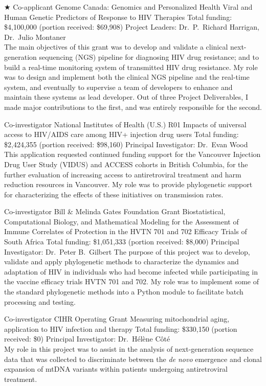 {$\bigstar$ Co-applicant}
{Genome Canada: Genomics and Personalized Health}
{Viral and Human Genetic Predictors of Response to HIV Therapies}
{Total funding: \$4,100,000 (portion received: \$69,908)}
{
Project Leaders: Dr.~P.~Richard Harrigan, Dr.~Julio Montaner\\
The main objectives of this grant was to develop and validate a clinical next-generation sequencing (NGS) pipeline for diagnosing HIV drug resistance;
and to build a real-time monitoring system of transmitted HIV drug resistance.
My role was to design and implement both the clinical NGS pipeline and the real-time system, and eventually to supervise a team of developers to enhance and maintain these systems as lead developer.
Out of three Project Deliverables, I made major contributions to the first, and was entirely responsible for the second.\\
}


{Co-investigator}
{National Institutes of Health (U.S.) R01}
{Impacts of universal access to HIV/AIDS care among HIV+ injection drug users}
{Total funding: \$2,424,355 (portion received: \$98,160)}
{
Principal Investigator: Dr.~Evan Wood\\
This application requested continued funding support for the Vancouver Injection Drug User Study (VIDUS) and ACCESS cohorts in British Columbia, for the further evaluation of increasing access to antiretroviral treatment and harm reduction resources in Vancouver.
My role was to provide phylogenetic support for characterizing the effects of these initiatives on transmission rates.\\
}


{Co-investigator}
{Bill \& Melinda Gates Foundation Grant}
{Biostatistical, Computational Biology, and Mathematical Modeling for the Assessment of
Immune Correlates of Protection in the HVTN 701 and 702 Efficacy Trials of South Africa}
{Total funding: \$1,051,333 (portion received: \$8,000)}
{
Principal Investigator: Dr.~Peter B.~Gilbert
The purpose of this project was to develop, validate and apply phylogenetic methods to characterize the dynamics and adaptation of HIV in individuals who had become infected while participating in the vaccine efficacy trials HVTN 701 and 702.
My role was to implement some of the standard phylogenetic methods into a Python module to facilitate batch processing and testing.\\
}


{Co-investigator}
{CIHR Operating Grant}
{Measuring mitochondrial aging, application to HIV infection and therapy}
{Total funding: \$330,150 (portion received: \$0)}
{
Principal Investigator: Dr.~H\'el\`ene C\^ot\'e\\
My role in this project was to assist in the analysis of next-generation sequence data that was collected to discriminate between the \textit{de novo} emergence and clonal expansion of mtDNA variants within patients undergoing antiretroviral treatment.\\
}

